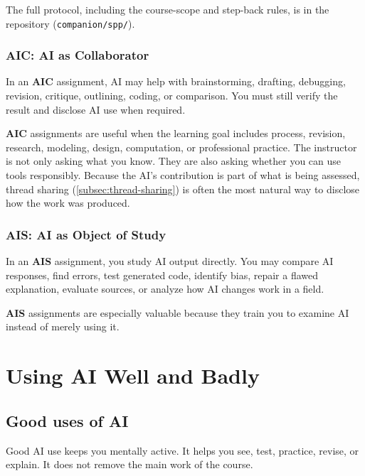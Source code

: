 \documentclass{SIAMbook2023}
\newcommand{\AIC}{\textcolor{catAIC}{\textbf{AIC}}}
\newcommand{\AIS}{\textcolor{catAIS}{\textbf{AIS}}}
\begin{document}
The full protocol, including the course-scope and step-back rules, is in the repository (\texttt{companion/spp/}).

\subsection{\texorpdfstring{\AIC{}: AI as Collaborator}{AIC: AI as Collaborator}}
\label{subsec:green}

In an \AIC{} assignment, AI may help with brainstorming, drafting, debugging, revision, critique, outlining, coding, or comparison. You must still verify the result and disclose AI use when required.

\AIC{} assignments are useful when the learning goal includes process, revision, research, modeling, design, computation, or professional practice. The instructor is not only asking what you know. They are also asking whether you can use tools responsibly. Because the AI's contribution is part of what is being assessed, thread sharing (\cref{subsec:thread-sharing}) is often the most natural way to disclose how the work was produced.

\subsection{\texorpdfstring{\AIS{}: AI as Object of Study}{AIS: AI as Object of Study}}
\label{subsec:blue}

In an \AIS{} assignment, you study AI output directly. You may compare AI responses, find errors, test generated code, identify bias, repair a flawed explanation, evaluate sources, or analyze how AI changes work in a field.

\AIS{} assignments are especially valuable because they train you to examine AI instead of merely using it.

\chapter{Using AI Well and Badly}
\label{ch:using-ai-well-and-badly}%

\section{Good uses of AI}
\label{sec:good-uses}%

Good AI use keeps you mentally active. It helps you see, test, practice, revise, or explain. It does not remove the main work of the course.
\end{document}
